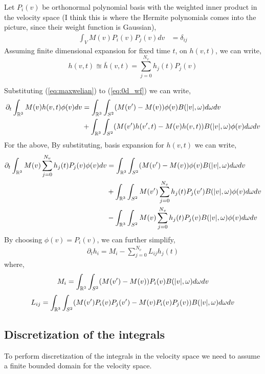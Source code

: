 \documentclass{article}
\begin{document}
Let $P_i(v)$ be orthonormal polynomial basis with the weighted inner product in the velocity space (I think this is where the Hermite polynomials comes into the picture, since their weight function is Gaussian),
\begin{align}
    \int_{V} M(v)P_i(v)P_j(v) dv &= \delta_{ij}
\end{align}
Assuming finite dimensional expansion for fixed time $t$, on $h(v,t)$, we can write, 
\begin{equation}
    h(v,t) \approxeq \bar{h}(v,t) = \sum_{j=0}^{N_v} h_j(t) P_j(v)
\end{equation}

Substituting (\ref{eq:maxwelian}) to (\ref{eq:0d_wf}) we can write, 
\begin{align}
    \partial_t \int_{\mathbb{R}^3} M(v)h(v,t)\phi(v) dv &=  \int_{\mathbb{R}^3} \int_{S^2} (M(v^\prime) - M(v)) \phi(v) B(|v|,\omega) d\omega dv\\
    &+\int_{\mathbb{R}^3} \int_{S^2} (M(v^\prime)h(v^\prime,t) - M(v)h(v,t)) B(|v|,\omega) \phi(v) d\omega dv
\end{align}
For the above, By substituting, basis expansion for $h(v,t)$ we can write, 
\begin{align}
    \partial_t \int_{\mathbb{R}^3} M(v)\sum_{j=0}^{N_v} h_j(t) P_j(v) \phi(v) dv &= \int_{\mathbb{R}^3} \int_{S^2} (M(v^\prime) - M(v)) \phi(v) B(|v|,\omega) d\omega dv\\
    &+\int_{\mathbb{R}^3} \int_{S^2} M(v^\prime)\sum_{j=0}^{N_v} h_j(t) P_j(v^\prime) B(|v|,\omega) \phi(v) d\omega dv\\
    &-\int_{\mathbb{R}^3} \int_{S^2} M(v)\sum_{j=0}^{N_v} h_j(t) P_j(v) B(|v|,\omega) \phi(v) d\omega dv
\end{align}
By choosing $\phi(v) = P_i(v)$, we can further simplify, 
\begin{align}
    \partial_t{h_i} = M_i  - \sum_{j=0}^{N_v} L_{ij} h_j(t)
\end{align} where, 
\begin{equation}
    M_i = \int_{\mathbb{R}^3} \int_{S^2} (M(v^\prime) - M(v)) P_i(v) B(|v|,\omega) d\omega dv
\end{equation}
\begin{equation}
    L_{ij} = \int_{\mathbb{R}^3} \int_{S^2} (M(v^\prime) P_i(v)P_j(v^\prime)  - M(v) P_i(v) P_j(v) )  B(|v|,\omega) d\omega dv
\end{equation}


\subsection{Discretization of the integrals}
\label{subsec:discretization_integrals}
To perform discretization of the integrals in the velocity space we need to assume a finite bounded domain for the velocity space. 
\end{document}
